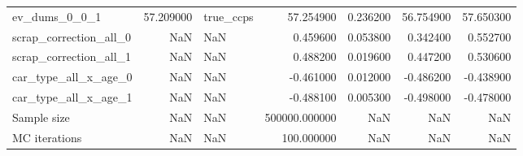 \begin{tabular}{lrlrrrr}
ev_dums_0_0_1 & 57.209000 & true_ccps & 57.254900 & 0.236200 & 56.754900 & 57.650300 \\
scrap_correction_all_0 & NaN & NaN & 0.459600 & 0.053800 & 0.342400 & 0.552700 \\
scrap_correction_all_1 & NaN & NaN & 0.488200 & 0.019600 & 0.447200 & 0.530600 \\
car_type_all_x_age_0 & NaN & NaN & -0.461000 & 0.012000 & -0.486200 & -0.438900 \\
car_type_all_x_age_1 & NaN & NaN & -0.488100 & 0.005300 & -0.498000 & -0.478000 \\
Sample size & NaN & NaN & 500000.000000 & NaN & NaN & NaN \\
MC iterations & NaN & NaN & 100.000000 & NaN & NaN & NaN \\
\bottomrule
\end{tabular}
